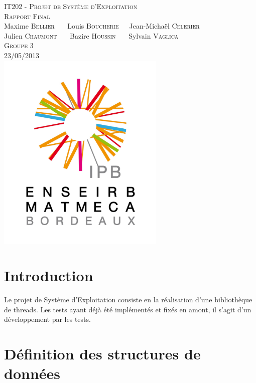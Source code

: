 \documentclass[a4paper,11pt]{article}
\begin{document}
\begin{titlepage}
  \begin{center}

    \textsc{IT202 - Projet de Système d'Exploitation}\\[2cm]
    \textsc{\large Rapport Final}\\[3cm]
    Maxime \textsc{Bellier} \ \ \ Louis \textsc{Boucherie}\ \ \ Jean-Michaël \textsc{Celerier}\\
    Julien \textsc{Chaumont} \ \ \ Bazire \textsc{Houssin} \ \ \ Sylvain \textsc{Vaglica}\\[1cm]
    \textsc{Groupe 3}\\[1.5cm]
    \textsc{\large 23/05/2013 }\\[1.5cm] %
    \includegraphics[width=8cm]{logo.png}

  \end{center}
  \vspace{3cm}

\end{titlepage}

\clearpage

\section*{Introduction}

Le projet de Système d'Exploitation consiste en la réalisation d'une bibliothèque de threads. Les tests ayant déjà été implémentés et fixés en amont, il s'agit d'un développement par les tests.



\section{Définition des structures de données}
\end{document}
